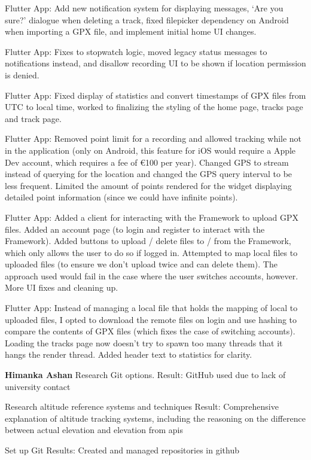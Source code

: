 \documentclass[12pt]{article}
\begin{document}
Flutter App: Add new notification system for displaying messages, ‘Are you sure?’ dialogue when deleting a track, fixed filepicker dependency on Android when importing a GPX file, and implement initial home UI changes.

Flutter App: Fixes to stopwatch logic, moved legacy status messages to notifications instead, and disallow recording UI to be shown if location permission is denied.

Flutter App: Fixed display of statistics and convert timestamps of GPX files from UTC to local time, worked to finalizing the styling of the home page, tracks page and track page.

Flutter App: Removed point limit for a recording and allowed tracking while not in the application (only on Android, this feature for iOS would require a Apple Dev account, which requires a fee of €100 per year). Changed GPS to stream instead of querying for the location and changed the GPS query interval to be less frequent. Limited the amount of points rendered for the widget displaying detailed point information (since we could have infinite points).

Flutter App: Added a client for interacting with the Framework to upload GPX files. Added an account page (to login and register to interact with the Framework). Added buttons to upload / delete files to / from the Framework, which only allows the user to do so if logged in. Attempted to map local files to uploaded files (to ensure we don't upload twice and can delete them). The approach used would fail in the case where the user switches accounts, however. More UI fixes and cleaning up.

Flutter App: Instead of managing a local file that holds the mapping of local to uploaded files, I opted to download the remote files on login and use hashing to compare the contents of GPX files (which fixes the case of switching accounts). Loading the tracks page now doesn't try to spawn too many threads that it hangs the render thread. Added header text to statistics for clarity.

{\large\textbf{Himanka Ashan}}
Research Git options. 
Result: GitHub used due to lack of university contact 

Research altitude reference systems and techniques 
Result: Comprehensive explanation of altitude tracking systems, including the reasoning on the difference between actual elevation and elevation from apis 

Set up Git 
Results: Created and managed repositories in github 
\end{document}
